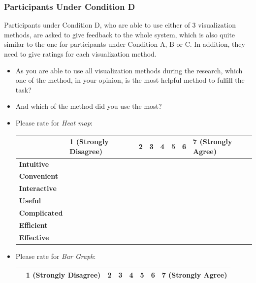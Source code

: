 \subsubsection{Participants Under Condition D}
Participants under Condition D, who are able to use either of 3 visualization methods, are asked to give feedback to the whole system, which is also quite similar to the one for participants under Condition A, B or C. In addition, they need to give ratings for each visualization method.
\begin{itemize}
	\item As you are able to use all visualization methods during the research, which one of the method, in your opinion, is the most helpful method to fulfill the task?
	\item And which of the method did you use the most?
	\item Please rate for \textit{Heat map}:
		\begin{center}
		\begin{tabular}{ | l | l | l | l | l | l | l | l | }
			\hline
			& 1 (Strongly Disagree) & 2 & 3 & 4 & 5 & 6 & 7 (Strongly Agree) \\ \hline
			\textbf{Intuitive}   &                       &   &   &   &   &   &                    \\ \hline
			\textbf{Convenient}  &                       &   &   &   &   &   &                    \\ \hline
			\textbf{Interactive} &                       &   &   &   &   &   &                    \\ \hline
			\textbf{Useful}      &                       &   &   &   &   &   &                    \\ \hline
			\textbf{Complicated} &                       &   &   &   &   &   &                    \\ \hline
			\textbf{Efficient}   &                       &   &   &   &   &   &                    \\ \hline
			\textbf{Effective}   &                       &   &   &   &   &   &                    \\ \hline
		\end{tabular}
	\end{center}
		\item Please rate for \textit{Bar Graph}:
	\begin{center}
		\begin{tabular}{ | l | l | l | l | l | l | l | l | }
			\hline
			& 1 (Strongly Disagree) & 2 & 3 & 4 & 5 & 6 & 7 (Strongly Agree) \\ \hline

\end{tabular}
\end{center}
\end{itemize}
